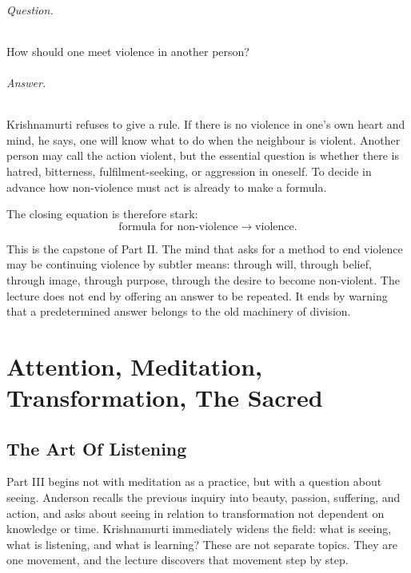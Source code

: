 \documentclass[11pt,oneside]{book}
\begin{document}
\paragraph{Question.}
How should one meet violence in another person?

\paragraph{Answer.}
Krishnamurti refuses to give a rule. If there is no violence in one's own heart and mind, he says, one will know what to do when the neighbour is violent. Another person may call the action violent, but the essential question is whether there is hatred, bitterness, fulfilment-seeking, or aggression in oneself. To decide in advance how non-violence must act is already to make a formula.

The closing equation is therefore stark:
\begin{equation}
\text{formula for non-violence}
\longrightarrow
\text{violence}.
\end{equation}

This is the capstone of Part II. The mind that asks for a method to end violence may be continuing violence by subtler means: through will, through belief, through image, through purpose, through the desire to become non-violent. The lecture does not end by offering an answer to be repeated. It ends by warning that a predetermined answer belongs to the old machinery of division.


\part{Attention, Meditation, Transformation, The Sacred}

\chapter{The Art Of Listening}

Part III begins not with meditation as a practice, but with a question about seeing. Anderson recalls the previous inquiry into beauty, passion, suffering, and action, and asks about seeing in relation to transformation not dependent on knowledge or time. Krishnamurti immediately widens the field: what is seeing, what is listening, and what is learning? These are not separate topics. They are one movement, and the lecture discovers that movement step by step.
\end{document}
